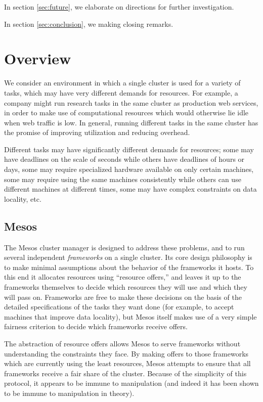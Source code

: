 \documentclass{acm_proc_article-sp}
\begin{document}
In section \ref{sec:future}, we elaborate on directions for further
investigation.

In section \ref{sec:conclusion}, we making closing remarks.



\section{Overview}
\label{sec:overview}

We consider an environment in which a single cluster is used for a variety of
tasks, which may have very different demands for resources. For example, a
company might run research tasks in the same cluster as production web services,
in order to make use of computational resources which would otherwise lie idle
when web traffic is low. In general, running different tasks in the same cluster
has the promise of improving utilization and reducing overhead. 

Different tasks may have significantly different demands for resources; some may
have deadlines on the scale of seconds while others have deadlines of hours or
days, some may require specialized hardware available on only certain machines,
some may require using the same machines consistently while others can use
different machines at different times, some may have complex constraints on data
locality, etc. 

\subsection{Mesos}
The Mesos cluster manager is designed to address these problems, and to run
several independent \emph{frameworks} on a single cluster. Its core design philosophy
is to make minimal assumptions about the behavior of the frameworks it hosts. To
this end it allocates resources using ``resource offers,'' and leaves it up to the
frameworks themselves to decide which resources they will use and which they
will pass on. Frameworks are free to make these decisions on the basis of the
detailed specifications of the tasks they want done (for example, to accept
machines that improve data locality), but Mesos itself makes use of a very
simple fairness criterion to decide which frameworks receive offers.

The abstraction of resource offers allows Mesos to serve frameworks without
understanding the constraints they face. By making offers to those frameworks
which are currently using the least resources, Mesos attempts to ensure that all
frameworks receive a fair share of the cluster. Because of the simplicity of
this protocol, it appears to be immune to manipulation (and indeed it has been
shown to be immune to manipulation in theory).
\end{document}
